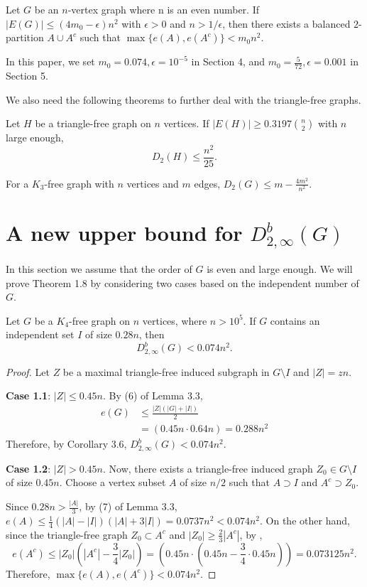 \documentclass[11pt, oneside]{article}   	%
\begin{document}
\begin{Cor}
     Let $G$ be an $n$-vertex graph where n is an even number. If $|E(G)|\leq (4m_0-\epsilon)n^2$ with $\epsilon>0$ and $n>1/\epsilon$, then there exists a balanced $2$-partition $A\cup A^c$ such that $\max\{e(A),e(A^c)\}<m_0 n^2$.
\end{Cor}
 In this paper, we set $m_0=0.074, \epsilon=10^{-5}$ in Section 4, and $m_0=\frac{5}{72}, \epsilon=0.001$ in Section 5. 

We also need the following theorems to further deal with the triangle-free graphs.
\begin{Th}\cite{balogh2021}
     Let $H$ be a triangle-free graph on $n$ vertices. If $|E(H)| \geq 0.3197\binom{n}{2}$ with $n$ large enough, $$D_2(H) \leq \frac{n^2}{25}.$$  
\end{Th}

\begin{Th}\cite{erdos1988}
     For a $K_3$-free graph with $n$ vertices and $m$ edges,
    $D_2(G) \leq  m-\frac{4 m^2}{n^2}$.
\end{Th}

\section{A new upper bound for $D_{2,\infty}^b(G)$}

In this section we assume that the order of $G$ is even and large enough. We will prove Theorem 1.8 by considering two cases based on the independent number of $G$.

\begin{lemma}
Let $G$ be a $K_4$-free graph on $n$ vertices, where $n>10^5$. If $G$ contains an independent set $I$ of size $0.28n$, then
    $$
        D_{2,\infty}^b(G)< 0.074n^2.
    $$
\end{lemma}  
\begin{proof}
    Let $Z$ be a maximal triangle-free induced subgraph in $G\setminus I$ and $|Z|=z n$.

\textbf{Case 1.1}: $|Z|\leq 0.45n$. By (6) of Lemma 3.3, 
    $$
    \begin{aligned}
        e(G) &\leq \frac{|Z|(|G|+|I|)}{2} \\
             &= (0.45n\cdot 0.64n)= 0.288n^2
    \end{aligned}
    $$     
Therefore, by Corollary 3.6, $D_{2,\infty}^b(G)< 0.074 n^2$. 

\textbf{Case 1.2}: $|Z|> 0.45n$. Now, there exists a triangle-free induced graph $Z_0\in G\setminus I$ of size $0.45n$. Choose a vertex subset $A$ of size $n/2$ such that $A\supset I$ and $A^c\supset Z_0$.    
    
    Since $0.28n>\frac{|A|}{3}$, by (7) of Lemma 3.3, $e(A)\leq \frac{1}{4}(|A|-|I|)(|A|+3|I|)=0.0737n^2<0.074n^2$. On the other hand, since the triangle-free graph $Z_0\subset A^c$ and $|Z_0|\geq \frac{2}{3}|A^c|$, by ,
    $$
    e(A^c)\leq |Z_0|(|A^c|-\frac{3}{4}|Z_0|)=(0.45n\cdot (0.45n-\frac 3 4\cdot 0.45n))=0.073125 n^2.
    $$
Therefore, $\max\{e(A),e(A^c)\}<0.074n^2$.
    
\end{proof}
\end{document}
